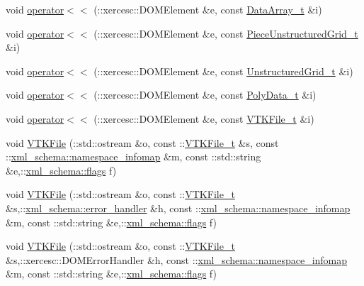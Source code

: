 \begin{DoxyCompactItemize}
\item 
void \hyperlink{vtk-unstructured_8cpp_a90ac4d883593f3e71cc24b0c8a53f745}{operator$<$$<$} (\+::xercesc\+::\+D\+O\+M\+Element \&e, const \hyperlink{classDataArray__t}{Data\+Array\+\_\+t} \&i)
\item 
void \hyperlink{vtk-unstructured_8cpp_a145ab456a0b4837b55ff6755514fd7d4}{operator$<$$<$} (\+::xercesc\+::\+D\+O\+M\+Element \&e, const \hyperlink{classPieceUnstructuredGrid__t}{Piece\+Unstructured\+Grid\+\_\+t} \&i)
\item 
void \hyperlink{vtk-unstructured_8cpp_a53b72fe6aa7e7f479b37e10e807fe4f4}{operator$<$$<$} (\+::xercesc\+::\+D\+O\+M\+Element \&e, const \hyperlink{classUnstructuredGrid__t}{Unstructured\+Grid\+\_\+t} \&i)
\item 
void \hyperlink{vtk-unstructured_8cpp_abece001f0a506ac3847ede9a0a72d81d}{operator$<$$<$} (\+::xercesc\+::\+D\+O\+M\+Element \&e, const \hyperlink{classPolyData__t}{Poly\+Data\+\_\+t} \&i)
\item 
void \hyperlink{vtk-unstructured_8cpp_ac655f285f1cdc6fc044b7d58a7596a6a}{operator$<$$<$} (\+::xercesc\+::\+D\+O\+M\+Element \&e, const \hyperlink{classVTKFile__t}{V\+T\+K\+File\+\_\+t} \&i)
\item 
void \hyperlink{vtk-unstructured_8cpp_a60fc47cfc610f6c31dfd3b0c12892e49}{V\+T\+K\+File} (\+::std\+::ostream \&o, const \+::\hyperlink{classVTKFile__t}{V\+T\+K\+File\+\_\+t} \&s, const \+::\hyperlink{namespacexml__schema_a17712c8260e03226f0a9e4d21ab78f42}{xml\+\_\+schema\+::namespace\+\_\+infomap} \&m, const \+::std\+::string \&e,\+::\hyperlink{namespacexml__schema_a0612287d030cb2732d31a45b258fdc87}{xml\+\_\+schema\+::flags} f)
\item 
void \hyperlink{vtk-unstructured_8cpp_abe499904eca404dadf8429281c88a3a2}{V\+T\+K\+File} (\+::std\+::ostream \&o, const \+::\hyperlink{classVTKFile__t}{V\+T\+K\+File\+\_\+t} \&s,\+::\hyperlink{namespacexml__schema_a0a5d9528e9175cedf199984a8bb64d62}{xml\+\_\+schema\+::error\+\_\+handler} \&h, const \+::\hyperlink{namespacexml__schema_a17712c8260e03226f0a9e4d21ab78f42}{xml\+\_\+schema\+::namespace\+\_\+infomap} \&m, const \+::std\+::string \&e,\+::\hyperlink{namespacexml__schema_a0612287d030cb2732d31a45b258fdc87}{xml\+\_\+schema\+::flags} f)
\item 
void \hyperlink{vtk-unstructured_8cpp_af6a299b24ebe8c1465bc6164376a10bc}{V\+T\+K\+File} (\+::std\+::ostream \&o, const \+::\hyperlink{classVTKFile__t}{V\+T\+K\+File\+\_\+t} \&s,\+::xercesc\+::\+D\+O\+M\+Error\+Handler \&h, const \+::\hyperlink{namespacexml__schema_a17712c8260e03226f0a9e4d21ab78f42}{xml\+\_\+schema\+::namespace\+\_\+infomap} \&m, const \+::std\+::string \&e,\+::\hyperlink{namespacexml__schema_a0612287d030cb2732d31a45b258fdc87}{xml\+\_\+schema\+::flags} f)

\end{DoxyCompactItemize}
